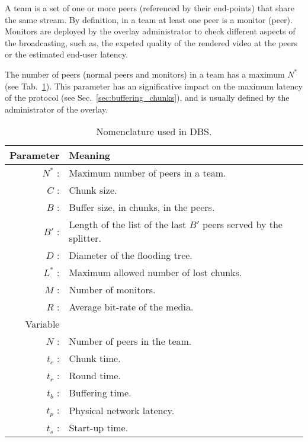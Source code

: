

\label{sec:team_def}

A team is a set of one or more peers (referenced by their end-points)
that share the same stream. By definition, in a team at least one peer
is a \gls{monitor} (peer). Monitors are deployed by the overlay
administrator to check different aspects of the broadcasting, such as,
the expeted quality of the rendered video at the peers or the
estimated end-user latency.

The number of peers (normal peers and monitors) in a team has a
maximum $N^*$ (see Tab.~\ref{tab:DBS_nomenclature}). This parameter
has an significative impact on the maximum latency of the protocol (see
Sec.~\ref{sec:buffering_chunks}), and is usually defined by the
administrator of the overlay.

\begin{table}[t]
  \centering
  \begin{tabular}{rl}
    Parameter & Meaning \\
    \hline
    $N^*$ :  & Maximum number of peers in a team. \\
    $C$ :    & Chunk size. \\
    $B$ :    & Buffer size, in chunks, in the peers. \\
    $B'$ :   & Length of the list of the last $B'$ peers served by the splitter. \\ 
    $D$ :    & Diameter of the flooding tree. \\
    $L^*$ :  & Maximum allowed number of lost chunks. \\
    $M$ :    & Number of monitors. \\
    $R$ :    & Average bit-rate of the media. \\
    Variable & \\
    \hline
    $N$ :    & Number of peers in the team. \\
    $t_c$ :  & Chunk time. \\
    $t_r$ :  & Round time. \\
    $t_b$ :  & Buffering time. \\
    $t_p$ :  & Physical network latency. \\
    $t_s$ :  & Start-up time.
  \end{tabular}
  \caption{Nomenclature used in DBS.} %
  \label{tab:DBS_nomenclature}
\end{table}

